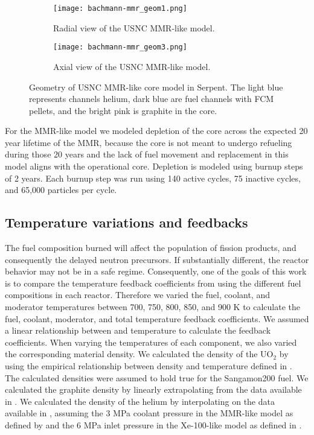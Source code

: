 \begin{figure}
        \begin{subfigure}{0.48\textwidth}
                \centering
                \texttt{[image: bachmann-mmr\_geom1.png]}
                \caption{Radial view of the USNC MMR-like model.}
                \label{fig:mmr_radial}
        \end{subfigure}
        \hfill 
        \begin{subfigure}{0.48\textwidth}
                \centering
                \texttt{[image: bachmann-mmr\_geom3.png]}
                \caption{Axial view of the USNC MMR-like model.}
                \label{fig:mmr_axial}
        \end{subfigure}
        \caption{Geometry of USNC MMR-like core model in Serpent. The 
        light blue represents channels helium, dark blue are fuel 
        channels with \gls{FCM} pellets, and the bright pink is graphite in the core.}
        \label{fig:mmr_core}
\end{figure}

For the \gls{MMR}-like model we modeled depletion of the core across the 
expected 20 year lifetime of the \gls{MMR}, because the core is not 
meant to undergo refueling during those 20 years and the lack of 
fuel movement and replacement in this model aligns with the operational 
core. Depletion is modeled using burnup steps of 2 years. Each burnup step 
was run using 140 active cycles, 75 inactive 
cycles, and 65,000 particles per cycle. 

\subsection{Temperature variations and feedbacks}
The fuel composition burned will affect the population of fission products, 
and consequently the delayed neutron precursors. If substantially different,
the reactor behavior may not be in a safe regime. Consequently, 
one of the goals of this work is to compare the temperature feedback 
coefficients from using the different fuel compositions in each 
reactor. Therefore we varied the fuel, coolant, and moderator temperatures 
between 700, 750, 800, 850, and 900 K to calculate the fuel, coolant, 
moderator, and total temperature feedback coefficients. We assumed a linear 
relationship between 
\keff and temperature to calculate the feedback coefficients. When varying the 
temperatures of each component, we also varied the corresponding material 
density. We calculated the 
density of the UO$_2$ by using the empirical relationship between density and 
temperature defined in \cite{fink_thermophysical_2000}. The calculated 
densities were assumed to hold true for the Sangamon200 fuel. 
We calculated the 
graphite density by linearly extrapolating from the data available in 
\cite{mceligot_thermal_nodate}. We calculated the density of the helium 
by interpolating on the data available in \cite{petersen_properties_nodate}, 
assuming the 3 MPa coolant pressure in the \gls{MMR}-like model as defined 
by \cite{noauthor_usnc_2021} and the 6 MPa inlet pressure in the 
Xe-100-like model as defined in \cite{mulder_overview_2021}. 

